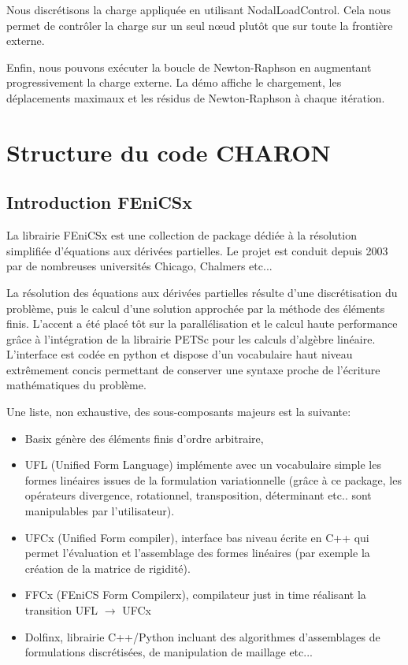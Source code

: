 \documentclass[10pt]{book}
\begin{document}
Nous discrétisons la charge appliquée en utilisant NodalLoadControl. Cela nous permet de contrôler la charge sur un seul nœud plutôt que sur toute la frontière externe.

Enfin, nous pouvons exécuter la boucle de Newton-Raphson en augmentant progressivement la charge externe. La démo affiche le chargement, les déplacements maximaux et les résidus de Newton-Raphson à chaque itération.

\chapter{Structure du code CHARON}\label{Chapitre:Structure du code CHARON}
\section*{Introduction FEniCSx}
La librairie FEniCSx est une collection de package dédiée à la résolution simplifiée d'équations aux dérivées partielles. Le projet est conduit depuis 2003 par de nombreuses universités Chicago, Chalmers etc...

La résolution des équations aux dérivées partielles résulte d'une discrétisation du problème, puis le calcul d'une solution approchée par la méthode des éléments finis. L'accent a été placé tôt sur la parallélisation et le calcul haute performance grâce à l'intégration de la librairie PETSc pour les calculs d'algèbre linéaire. L'interface est codée en python et dispose d'un vocabulaire haut niveau extrêmement concis permettant de conserver une syntaxe proche de l'écriture mathématiques du problème.

Une liste, non exhaustive, des sous-composants majeurs est la suivante:
\begin{itemize}
\item Basix génère des éléments finis d'ordre arbitraire,
\item UFL (Unified Form Language) implémente avec un vocabulaire simple les formes linéaires issues de la formulation variationnelle (grâce à ce package, les opérateurs divergence, rotationnel, transposition, déterminant etc.. sont manipulables par l'utilisateur).
\item UFCx (Unified Form compiler), interface bas niveau écrite en C++ qui permet l'évaluation et l'assemblage des formes linéaires (par exemple la création de la matrice de rigidité).
\item FFCx (FEniCS Form Compilerx), compilateur \og just in time \fg{} réalisant la transition UFL $\rightarrow$ UFCx
\item Dolfinx, librairie C++/Python incluant des algorithmes d'assemblages de formulations discrétisées, de manipulation de maillage etc...
\end{itemize}
\end{document}
